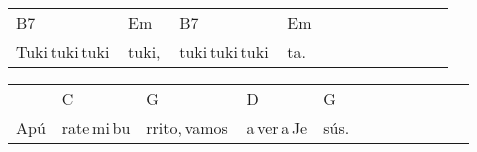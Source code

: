 \begin{multicols}{2}
\begin{minipage}{\columnwidth}
\noindent
\begin{tabular}{llllllllllll}
B7&Em&B7&Em\\
Tuki\,tuki\,tuki\,&tuki,\,&tuki\,tuki\,tuki\,&ta.
\end{tabular}

\noindent
\begin{tabular}{llllllllllll}
&C&G&D&G\\
Apú&rate\,mi\,bu&rrito,\,vamos\,&a\,ver\,a\,Je&sús.
\end{tabular}
\end{minipage}\\

\end{multicols}